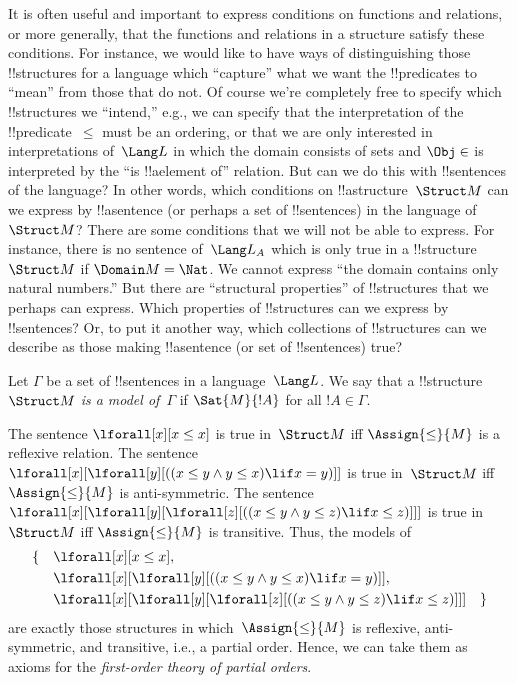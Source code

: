 \documentclass[../../../include/open-logic-section]{subfiles}
\begin{document}


\begin{explain}
It is often useful and important to express conditions on
functions and relations, or more generally, that the functions and
relations in a structure satisfy these conditions.  For instance, we
would like to have ways of distinguishing those !!{structure}s for a
language which ``capture'' what we want the !!{predicate}s to ``mean''
from those that do not.  Of course we're completely free to specify
which !!{structure}s we ``intend,'' e.g., we can specify that the
interpretation of the !!{predicate}~$\le$ must be an ordering, or that
we are only interested in interpretations of~$\Lang L$ in which the
domain consists of sets and $\Obj \in$ is interpreted by the ``is
!!a{element} of'' relation.  But can we do this with !!{sentence}s of
the language?  In other words, which conditions on
!!a{structure}~$\Struct M$ can we express by !!a{sentence} (or perhaps
a set of !!{sentence}s) in the language of~$\Struct M$?  There are
some conditions that we will not be able to express.  For instance,
there is no sentence of~$\Lang L_A$ which is only true in a
!!{structure}~$\Struct M$ if $\Domain M = \Nat$.  We cannot express
``the domain contains only natural numbers.''  But there are
``structural properties'' of !!{structure}s that we perhaps can
express.  Which properties of !!{structure}s can we express by
!!{sentence}s?  Or, to put it another way, which collections of
!!{structure}s can we describe as those making !!a{sentence} (or set
of !!{sentence}s) true?
\end{explain}

\begin{defn}
Let $\Gamma$ be a set of !!{sentence}s in a language~$\Lang L$.  We
say that a !!{structure}~$\Struct M$ \emph{is a model of}~$\Gamma$ if
$\Sat{M}{!A}$ for all $!A \in \Gamma$.
\end{defn}

\begin{ex}
The sentence $\lforall[x][x \le x]$ is true in~$\Struct M$ iff
$\Assign{\le}{M}$ is a reflexive relation.  The sentence
$\lforall[x][\lforall[y][((x \le y \land y \le x) \lif x = y)]]$ is
true in~$\Struct M$ iff $\Assign{\le}{M}$ is anti-symmetric.  The
sentence $\lforall[x][\lforall[y][\lforall[z][((x \le y \land y \le z)
      \lif x \le z)]]]$ is true in~$\Struct M$ iff $\Assign{\le}{M}$
is transitive.  Thus, the models of
\begin{align*}
\{\quad &\lforall[x][x \le x], \\
   & \lforall[x][\lforall[y][((x \le y \land y \le
    x) \lif x = y)]], \\
   &\lforall[x][\lforall[y][\lforall[z][((x \le y
      \land y \le z) \lif x \le z)]]] \quad \}
\end{align*}
are exactly those structures in which~$\Assign{\le}{M}$ is reflexive,
anti-symmetric, and transitive, i.e., a partial order.  Hence, we can take
them as axioms for the \emph{first-order theory of partial orders}.
\end{ex}
\end{document}
